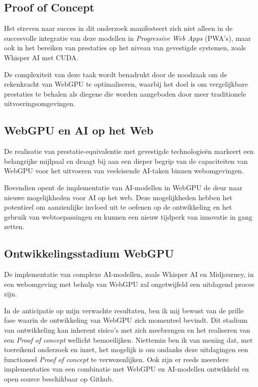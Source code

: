 

\subsection{Proof of Concept}
Het streven naar succes in dit onderzoek manifesteert zich niet alleen in de succesvolle integratie van deze modellen in \textit{Progressive Web Apps} (PWA's), maar ook in het bereiken van prestaties op het niveau van gevestigde systemen, zoals Whisper AI met CUDA.
 
\bigbreak{}
De complexiteit van deze taak wordt benadrukt door de noodzaak om de rekenkracht van WebGPU te optimaliseren, waarbij het doel is om vergelijkbare prestaties te behalen als diegene die worden aangeboden door meer traditionele uitvoeringsomgevingen. 

\subsection{WebGPU en AI op het Web}
De realisatie van prestatie-equivalentie met gevestigde technologieën markeert een belangrijke mijlpaal en draagt bij aan een dieper begrip van de capaciteiten van WebGPU voor het uitvoeren van veeleisende AI-taken binnen webomgevingen.

\bigbreak{}
Bovendien opent de implementatie van AI-modellen in WebGPU de deur naar nieuwe mogelijkheden voor AI op het web. Deze mogelijkheden hebben het potentieel om aanzienlijke invloed uit te oefenen op de ontwikkeling en het gebruik van webtoepassingen en kunnen een nieuw tijdperk van innovatie in gang zetten.

\subsection{Ontwikkelingsstadium WebGPU}
De implementatie van complexe AI-mo\-de\-llen, zoals Whisper AI en Midjourney, 
in een webomgeving met behulp van WebGPU zal ongetwijfeld een uitdagend proces zijn.

\bigbreak{}
In de anticipatie op mijn verwachte resultaten, ben ik mij bewust van de prille fase waarin de ontwikkeling van WebGPU zich momenteel bevindt. Dit stadium van ontwikkeling kan inherent risico's met zich meebrengen en het realiseren van een \textit{Proof of concept} wellicht bemoeilijken. Niettemin ben ik van mening dat, met toereikend onderzoek en inzet, het mogelijk is om ondanks deze uitdagingen een functioneel \textit{Proof of concept} te verwezenlijken. Ook zijn er reeds meerdere implementaties van een combinatie met WebGPU en AI-modellen ontwikkeld en open source beschikbaar op Github. \autocite{mlcai2023} 

